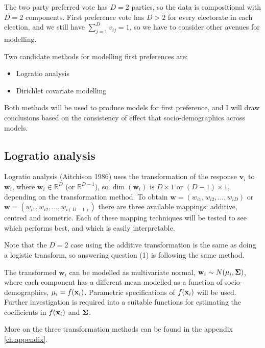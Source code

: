 \documentclass{monashthesis}
\theoremstyle{definition}
\theoremstyle{definition}
\theoremstyle{definition}
\theoremstyle{remark}
\begin{document}
The two party preferred vote has \(D=2\) parties, so the data is
compositional with \(D=2\) components. First preference vote has \(D>2\)
for every electorate in each election, and we still have
\(\sum_{j=1}^Dv_{ij} = 1\), so we have to consider other avenues for
modelling.

Two candidate methods for modelling first preferences are:

\begin{itemize}
\item
  Logratio analysis
\item
  Dirichlet covariate modelling
\end{itemize}

Both methods will be used to produce models for first preference, and I
will draw conclusions based on the consistency of effect that
socio-demographics across models.

\subsection{Logratio analysis}\label{logratio-analysis}

Logratio analysis (Aitchison 1986) uses the transformation of the
response \(\textbf{v}_i\) to \(\textbf{w}_i\), where
\(\textbf{w}_i \in \mathbb{R}^D\) (or \(\mathbb{R}^{D-1}\)), so
\(\dim(\textbf{w}_i) \text{ is } D\times1 \text{ or } (D-1) \times 1\),
depending on the transformation method. To obtain
\(\textbf{w} = (w_{i1}, w_{i2}, ..., w_{iD})\) or
\(\textbf{w} = (w_{i1}, w_{i2}, ..., w_{i(D-1)})\) there are three
available mappings: additive, centred and isometric. Each of these
mapping techniques will be tested to see which performs best, and which
is easily interpretable.

Note that the \(D=2\) case using the additive transformation is the same
as doing a logistic transform, so answering question (1) is following
the same method.

The transformed \(\textbf{w}_i\) can be modelled as multivariate normal,
\(\textbf{w}_i \sim{N({\mu_i}, {\bf \Sigma}})\), where each component
has a different mean modelled as a function of socio-demographics,
\({\bf\mu}_i = f({\bf x}_i)\). Parametric specifications of
\(f({\bf x}_i)\) will be used. Further investigation is required into a
suitable functions for estimating the coefficients in \(f({\bf x}_i)\)
and \({\bf \Sigma}\).

More on the three transformation methods can be found in the appendix
\ref{ch:appendix}.
\end{document}

